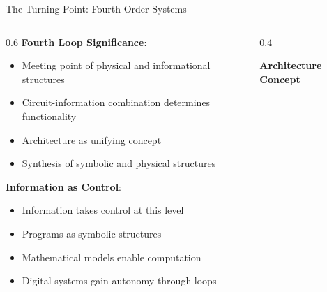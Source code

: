 \documentclass[aspectratio=169]{beamer}
\newcommand{\concept}[1]{\textbf{\color{darkblue}#1}}
\begin{document}
\begin{frame}{The Turning Point: Fourth-Order Systems}
\begin{columns}
\begin{column}{0.6\textwidth}
\concept{Fourth Loop Significance}:
\begin{itemize}
\item Meeting point of physical and informational structures
\item Circuit-information combination determines functionality
\item Architecture as unifying concept
\item Synthesis of symbolic and physical structures
\end{itemize}

\vspace{0.3cm}
\concept{Information as Control}:
\begin{itemize}
\item Information takes control at this level
\item Programs as symbolic structures
\item Mathematical models enable computation
\item Digital systems gain autonomy through loops
\end{itemize}
\end{column}
\begin{column}{0.4\textwidth}
\begin{center}
\textbf{Architecture Concept}
\vspace{0.3cm}

\end{center}
\end{column}
\end{columns}
\end{frame}
\end{document}

